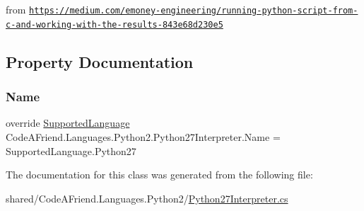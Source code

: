 from \href{https://medium.com/emoney-engineering/running-python-script-from-c-and-working-with-the-results-843e68d230e5}{\tt https\+://medium.\+com/emoney-\/engineering/running-\/python-\/script-\/from-\/c-\/and-\/working-\/with-\/the-\/results-\/843e68d230e5} 

\subsection{Property Documentation}
\mbox{\label{class_code_a_friend_1_1_languages_1_1_python2_1_1_python27_interpreter_aeae6049e330cf5a2d73e11b242b62b62}} 
\subsubsection{\texorpdfstring{Name}{Name}}
{\footnotesize\ttfamily override \mbox{\hyperlink{namespace_code_a_friend_1_1_data_model_a13e088c525db1b03a4de75420ced79b2}{Supported\+Language}} Code\+A\+Friend.\+Languages.\+Python2.\+Python27\+Interpreter.\+Name = Supported\+Language.\+Python27\hspace{0.3cm}{\ttfamily [get]}}







The documentation for this class was generated from the following file\+:\begin{DoxyCompactItemize}
\item 
shared/\+Code\+A\+Friend.\+Languages.\+Python2/\mbox{\hyperlink{_python27_interpreter_8cs}{Python27\+Interpreter.\+cs}}\end{DoxyCompactItemize}
